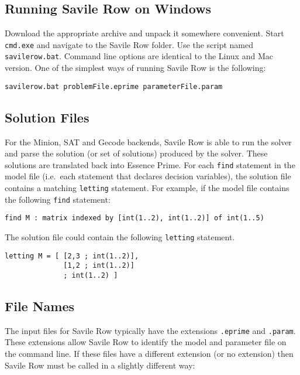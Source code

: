 \documentclass[a4paper]{article}
\newcommand{\eprime}{{\sc Essence Prime}\xspace}
\newcommand{\savilerow}{{\sc Savile Row}\xspace}
\begin{document}
\subsection{Running \savilerow on Windows}

Download the appropriate archive and unpack it somewhere convenient. 
Start \texttt{cmd.exe} and navigate to the \savilerow folder. 
Use the script named \texttt{savilerow.bat}. Command line options are identical 
to the Linux and Mac version. One of the simplest ways of running \savilerow is the following:

\begin{verbatim}
savilerow.bat problemFile.eprime parameterFile.param
\end{verbatim}


\subsection{Solution Files}

For the Minion, SAT and Gecode backends, \savilerow is able to run the solver and parse the solution (or set of solutions) 
produced by the solver. These solutions are translated back into \eprime.  
For each \texttt{find} statement in the model file (i.e.\ each statement that declares decision variables), 
the solution file contains
a matching \texttt{letting} statement. For example, if the model file contains the following \texttt{find} statement:

\begin{verbatim}
find M : matrix indexed by [int(1..2), int(1..2)] of int(1..5)
\end{verbatim}

The solution file could contain the following \texttt{letting} statement. 

\begin{verbatim}
letting M = [ [2,3 ; int(1..2)],
              [1,2 ; int(1..2)]
              ; int(1..2) ]
\end{verbatim}

\subsection{File Names}\label{sub:filenames}

The input files for \savilerow typically have the extensions \texttt{.eprime} and \texttt{.param}.
These extensions allow \savilerow to identify the model and parameter file on the 
command line. If these files have a different extension (or no extension) then
\savilerow must be called in a slightly different way:
\end{document}
